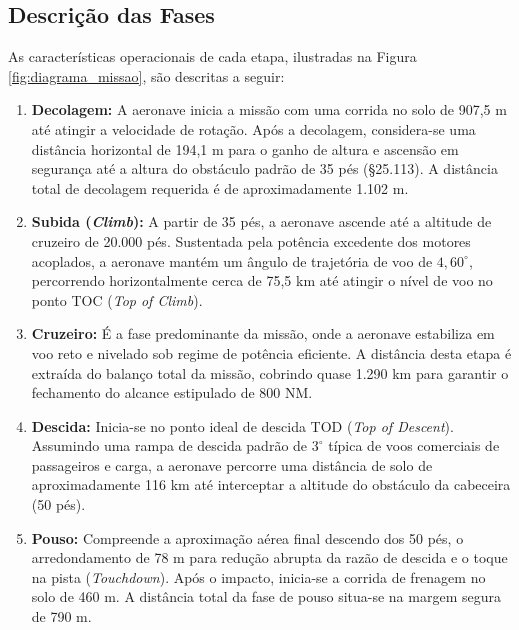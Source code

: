 \subsection{Descrição das Fases}

As características operacionais de cada etapa, ilustradas na Figura \ref{fig:diagrama_missao}, são descritas a seguir:

\begin{enumerate}
    \item \textbf{Decolagem:} A aeronave inicia a missão com uma corrida no solo  de 907,5 m até atingir a velocidade de rotação. Após a decolagem, considera-se uma distância horizontal de 194,1 m para o ganho de altura e ascensão em segurança até a altura do obstáculo padrão de 35 pés (\S25.113). A distância total de decolagem requerida é de aproximadamente 1.102 m.
    
    \item \textbf{Subida (\textit{Climb}):} A partir de 35 pés, a aeronave ascende até a altitude de cruzeiro de 20.000 pés. Sustentada pela potência excedente dos motores acoplados, a aeronave mantém um ângulo de trajetória de voo de $4{,}60^{\circ}$, percorrendo horizontalmente cerca de 75,5 km até atingir o nível de voo no ponto TOC (\textit{Top of Climb}).
    
    \item \textbf{Cruzeiro:} É a fase predominante da missão, onde a aeronave estabiliza em voo reto e nivelado sob regime de potência eficiente. A distância desta etapa é extraída do balanço total da missão, cobrindo quase 1.290 km para garantir o fechamento do alcance estipulado de 800 NM.
    
    \item \textbf{Descida:} Inicia-se no ponto ideal de descida TOD (\textit{Top of Descent}). Assumindo uma rampa de descida padrão de $3^{\circ}$ típica de voos comerciais de passageiros e carga, a aeronave percorre uma distância de solo de aproximadamente 116 km até interceptar a altitude do obstáculo da cabeceira (50 pés).
    
    \item \textbf{Pouso:} Compreende a aproximação aérea final descendo dos 50 pés, o arredondamento de 78 m para redução abrupta da razão de descida e o toque na pista (\textit{Touchdown}). Após o impacto, inicia-se a corrida de frenagem no solo de 460 m. A distância total da fase de pouso situa-se na margem segura de 790 m.
\end{enumerate}

